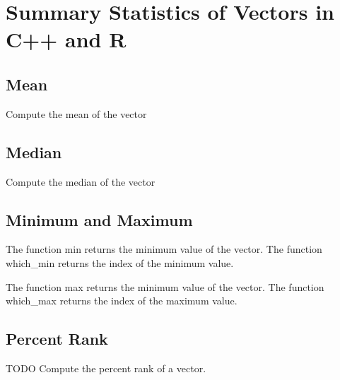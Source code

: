 \chapter{Summary Statistics of Vectors in C++ and R}

\section{Mean}
Compute the mean of the vector

\lstset{language=C++}


\section{Median}
Compute the median of the vector

\lstset{language=C++}


\section{Minimum and Maximum}
The function min returns the minimum value of the vector. The function which\_min returns the index of the minimum value.

\lstset{language=C++}



The function max returns the minimum value of the vector. The function which\_max returns the index of the maximum value.
\lstset{language=C++}


\section{Percent Rank}
TODO Compute the percent rank of a vector.

%

\lstset{language=R}

